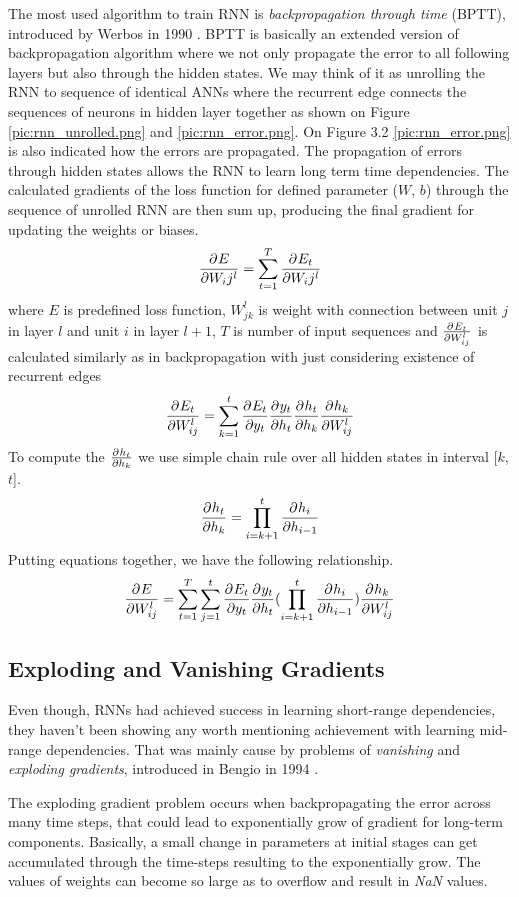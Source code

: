 The most used algorithm to train RNN is \textit{backpropagation through time} (BPTT), introduced by Werbos in 1990 \cite{werbos_bptt}.
BPTT is basically an extended version of backpropagation algorithm where we not only propagate the error to all following layers but also through the hidden states.
We may think of it as unrolling the RNN to sequence of identical ANNs where the recurrent edge connects the sequences of neurons in hidden layer together as shown on Figure \ref{pic:rnn_unrolled.png} and \ref{pic:rnn_error.png}.
On Figure 3.2 \ref{pic:rnn_error.png} is also indicated how the errors are propagated.
The propagation of errors through hidden states allows the RNN to learn long term time dependencies.
The calculated gradients of the loss function for defined parameter ($W$, $b$) through the sequence of unrolled RNN are then sum up, producing the final gradient for updating the weights or biases.
\[ \frac{\partial^{} E}{\partial W_ij^l} = \sum_{t=1}^{T}\frac{\partial^{} E_t}{\partial W_ij^l} \]
where $E$ is predefined loss function, ${W_{jk}^l}$ is weight with connection between unit $j$ in layer $l$ and unit $i$ in layer $l+1$, $T$ is number of input sequences and $\frac{\partial^{} E_t}{\partial W_{ij}^l}$ is calculated similarly as in backpropagation with just considering existence of recurrent edges
\[ \frac{\partial^{} E_t}{\partial W_{ij}^l} = \sum_{k=1}^{t}\frac{\partial^{} E_t}{\partial y_t}\frac{\partial^{} y_t}{\partial h_t}\frac{\partial^{} h_t}{\partial h_k}\frac{\partial^{} h_k}{\partial W_{ij}^l} \]
To compute the $\frac{\partial^{} h_t}{\partial h_k}$ we use simple chain rule over all hidden states in interval [$k$,$t$].
\[ \frac{\partial^{} h_t}{\partial h_k} = \prod_{i=k+1}^{t}\frac{\partial^{} h_i}{\partial h_{i-1}} \]
Putting equations together, we have the following relationship\cite{rnn_dif}.
\[  \frac{\partial^{} E}{\partial W_{ij}^l} = \sum_{t=1}^{T}\sum_{j=1}^{t}\frac{\partial^{} E_t}{\partial y_t}\frac{\partial^{} y_t}{\partial h_t}(\prod_{i=k+1}^{t}\frac{\partial^{} h_i}{\partial h_{i-1}})\frac{\partial^{} h_k}{\partial W_{ij}^l} \]

\subsection{Exploding and Vanishing Gradients}

Even though, RNNs had achieved success in learning short-range dependencies, they haven’t been showing any worth mentioning achievement with learning mid-range dependencies.
That was mainly cause by problems of \textit{vanishing} and \textit{exploding gradients}, introduced in Bengio in 1994 \cite{vanishing_gradient}.

The exploding gradient problem occurs when backpropagating the error across many time steps, that could lead to exponentially grow of gradient for long-term components.
Basically, a small change in parameters at initial stages can get accumulated through the time-steps resulting to the exponentially grow.
The values of weights can become so large as to overflow and result in \textit{NaN} values.

